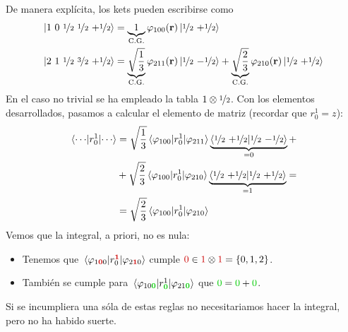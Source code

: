 De manera explícita, los kets pueden escribirse como
\begin{align}
  \ket{1\ 0 \ {\nicefrac{1}{2}} \ {\nicefrac{1}{2}} \ {+{\nicefrac{1}{2}}}} &= \underbrace{1}_{\text{C.G.}} 
  \varphi_{100}(\bm{\mathrm{r}}) \ket{{\nicefrac{1}{2}} \ {+{\nicefrac{1}{2}}}} \\
  \ket{2\ 1 \ {\nicefrac{1}{2}} \ \nicefrac{3}{2} \ {+{\nicefrac{1}{2}}}} &= \underbrace{\sqrt{\frac{1}{3}}}_{\text{C.G.}} 
  \varphi_{211}(\bm{\mathrm{r}}) \ket{{\nicefrac{1}{2}} \ {-{\nicefrac{1}{2}}}} + \underbrace{\sqrt{\frac{2}{3}}}_{\text{C.G.}} 
  \varphi_{210}(\bm{\mathrm{r}}) \ket{{\nicefrac{1}{2}} \ {+{\nicefrac{1}{2}}}}
\end{align}
En el caso no trivial se ha empleado la tabla $1\otimes {\nicefrac{1}{2}}$. Con los
elementos desarrollados, pasamos a calcular el elemento de matriz
(recordar que $r_0^1=z$):
\begin{equation}
  \begin{split}
    \mel*{\cdots}{r_0^1}{\cdots} &= \sqrt{\frac{1}{3}}
    \mel{\varphi_{100}}{r_0^1}{\varphi_{211}} \underbrace{\braket{{\nicefrac{1}{2}}\
        {+{\nicefrac{1}{2}}}}{{\nicefrac{1}{2}} \ {-{\nicefrac{1}{2}}}}}_{=0} + \\ &+\sqrt{\frac{2}{3}} 
    \mel{\varphi_{100}}{r_0^1}{\varphi_{210}} \underbrace{\braket{{\nicefrac{1}{2}}\
        {+{\nicefrac{1}{2}}}}{{\nicefrac{1}{2}} \ {+{\nicefrac{1}{2}}}}}_{=1} = \\
    &=\sqrt{\frac{2}{3}} \mel{\varphi_{100}}{r_0^1}{\varphi_{210}}
  \end{split}
  \label{eq:electriceye}
\end{equation}
Vemos que la integral, a priori, no es nula:
\begin{itemize}
\item Tenemos que
  $\mel{\varphi_{1\textcolor{red!80!black}{\boldrm{0}}0}}{r_0^{\textcolor{red!80!black}{\boldrm{1}}}}{\varphi_{2\textcolor{red!80!black}{\boldrm{1}}0}}$
  cumple $\textcolor{red!80!black}{0} \in
  \textcolor{red!80!black}{1}\otimes \textcolor{red!80!black}{1} =
  \{0,1,2\}$.
\item También se cumple para
  $\mel{\varphi_{10\textcolor{green!80!black}{\boldrm{0}}}}{r^1_{\textcolor{green!80!black}{\boldrm{0}}}}{\varphi_{21\textcolor{green!80!black}{\boldrm{0}}}}$
  que $\textcolor{green!80!black}{0}=\textcolor{green!80!black}{0} + \textcolor{green!80!black}{0}$.
\end{itemize}
Si se incumpliera una sóla de estas reglas no necesitariamos hacer la
integral, pero no ha habido suerte.

